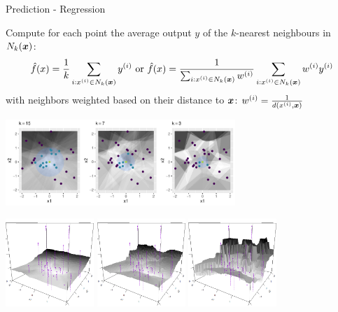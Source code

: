 \begin{vbframe}{Prediction - Regression}
\begin{footnotesize}
Compute for each point the average output $y$ of the $k$-nearest neighbours in $N_k(\bm{x})$: 
$$
\hat{f}(x) = \frac{1}{k} \sum_{i: x^{(i)} \in N_k(\bm{x})} y^{(i)} \text  { or }  
\hat{f}(x) = \frac{1}{\sum_{i: x^{(i)} \in N_k(\bm{x})} w^{(i)}} \sum_{i: x^{(i)} \in N_k(\bm{x})} w^{(i)} y^{(i)}
$$
with neighbors weighted based on their distance to $\bm{x}$: $w^{(i)} = \frac{1}{d(x^{(i)}, \bm{x})}$
\vspace{-0.3cm}
\begin{center}
\includegraphics[width=0.65\textwidth,keepaspectratio]{figure/reg_knn_contour}

\vspace{-0.1cm}
\includegraphics[width=0.25\textwidth]{figure/knn-reg-3d-15.png} 
\includegraphics[width=0.25\textwidth]{figure/knn-reg-3d-7.png}
\includegraphics[width=0.25\textwidth]{figure/knn-reg-3d-3.png}
\end{center}

\end{footnotesize}

\end{vbframe}

